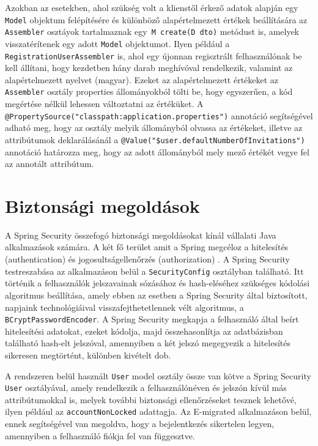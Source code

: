\begin{reviewed}
Azokban az esetekben, ahol szükség volt a klienstől érkező adatok alapján egy \texttt{Model} objektum felépítésére és különböző alapértelmezett értékek beállítására az \texttt{Assembler} osztáyok tartalmaznak egy\texttt{ M create(D dto)} metódust is, amelyek visszatérítenek egy adott \texttt{Model} objektumot. Ilyen például a \texttt{RegistrationUserAssembler} is, ahol egy újonnan regisztrált felhasználónak be kell állítani, hogy kezdetben hány darab meghívóval rendelkezik, valamint az alapértelmezett nyelvet (magyar). Ezeket az alapértelmezett értékeket az \texttt{Assembler} osztály properties állományokból tölti be, hogy egyszerűen, a kód megértése nélkül lehessen változtatni az értéküket. A \texttt{@PropertySource("classpath:application.properties")} annotáció segítségével adható meg, hogy az osztály melyik állományból olvassa az értékeket, illetve az attribútumok deklarálásánál a \texttt{@Value("\${user.defaultNumberOfInvitations}")} annotáció határozza meg, hogy az adott állományból mely mező értékét vegye fel az annotált attribútum.

\section{Biztonsági megoldások}
\label{subsec:biztonsag}
A Spring Security összefogó biztonsági megoldásokat kínál vállalati Java alkalmazások számára. A két fő terület amit a Spring megcéloz a hitelesítés (authentication) és jogosultságellenőrzés (authorization) \cite{SpringSec}. 
A Spring Security testreszabása az alkalmazáson belül a  \texttt{SecurityConfig} osztályban található. Itt történik a felhasználók jelszavainak sózásához és hash-eléséhez szükséges kódolási algoritmus beállítása, amely ebben az esetben a Spring Security által biztosított, napjaink technológiáival visszafejthetetlennek vélt algoritmus, a \texttt{BCryptPasswordEncoder}. A Spring Security megkapja a felhasználó által beírt hitelesítési adatokat, ezeket kódolja, majd összehasonlítja az adatbázisban található hash-elt jelszóval, amennyiben a két jelszó megegyezik a hitelesítés sikeresen megtörtént, különben kivételt dob. 

A rendszeren belül használt \texttt{User} model osztály össze van kötve a Spring Security \texttt{User} osztályával, amely rendelkezik a felhasználónéven és jelszón kívül más attribútumokkal is, melyek további biztonsági ellenőrzéseket tesznek lehetővé, ilyen például az \texttt{accountNonLocked} adattagja. Az E-migrated alkalmazáson belül, ennek segítségével van megoldva, hogy a bejelentkezés sikertelen legyen, amennyiben a felhasználó fiókja fel van függesztve.


\end{reviewed}
